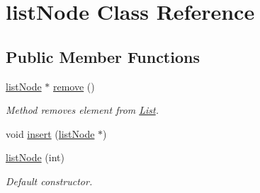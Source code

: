 \hypertarget{classlist_node}{\section{list\-Node Class Reference}
\label{classlist_node}
}
\subsection*{Public Member Functions}
\begin{DoxyCompactItemize}
\item 
\hypertarget{classlist_node_a71136bd2b6fe09b0865a7253cb4483e6}{\hyperlink{classlist_node}{list\-Node} $\ast$ \hyperlink{classlist_node_a71136bd2b6fe09b0865a7253cb4483e6}{remove} ()}\label{classlist_node_a71136bd2b6fe09b0865a7253cb4483e6}

\begin{DoxyCompactList}\small\item\em Method removes element from \hyperlink{class_list}{List}. \end{DoxyCompactList}\item 
void \hyperlink{classlist_node_aaac4138fef39e68ef030a504937c2a39}{insert} (\hyperlink{classlist_node}{list\-Node} $\ast$)
\item 
\hypertarget{classlist_node_ab56f7c11074eb9a72f87869acdb01cfc}{\hyperlink{classlist_node_ab56f7c11074eb9a72f87869acdb01cfc}{list\-Node} (int)}\label{classlist_node_ab56f7c11074eb9a72f87869acdb01cfc}

\begin{DoxyCompactList}\small\item\em Default constructor. \end{DoxyCompactList}\end{DoxyCompactItemize}
